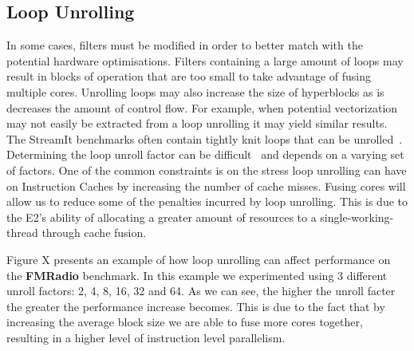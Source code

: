\subsection{Loop Unrolling}
In some cases, filters must be modified in order to better match with the potential hardware optimisations.
Filters containing a large amount of loops may result in blocks of operation that are too small to take advantage of fusing multiple cores.
Unrolling loops may also increase the size of hyperblocks as is decreases the amount of control flow.
For example, when potential vectorization may not easily be extracted from a loop unrolling it may yield similar results.
The StreamIt benchmarks often contain tightly knit loops that can be unrolled~\cite{}.
Determining the loop unroll factor can be difficult~\cite{} and depends on a varying set of factors.
One of the common constraints is on the stress loop unrolling can have on Instruction Caches by increasing the number of cache misses.
Fusing cores will allow us to reduce some of the penalties incurred by loop unrolling.
This is due to the E2's ability of allocating a greater amount of resources to a single-working-thread through cache fusion.

Figure X presents an example of how loop unrolling can affect performance on the \textbf{FMRadio} benchmark.
In this example we experimented using 3 different unroll factors: 2, 4, 8, 16, 32 and 64.
As we can see, the higher the unroll facter the greater the performance increase becomes.
This is due to the fact that by increasing the average block size we are able to fuse more cores together, resulting in a higher level of instruction level parallelism. 


